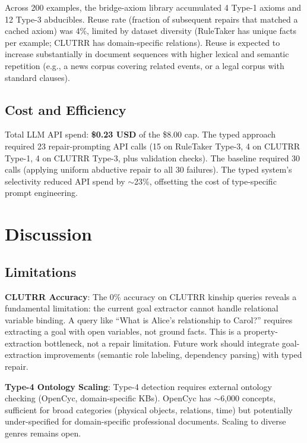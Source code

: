 \documentclass[11pt,letterpaper]{article}
\begin{document}
Across 200 examples, the bridge-axiom library accumulated 4 Type-1 axioms and 12
Type-3 abducibles. Reuse rate (fraction of subsequent repairs that matched a cached
axiom) was 4\%, limited by dataset diversity (RuleTaker has unique facts per example;
CLUTRR has domain-specific relations). Reuse is expected to increase substantially in
document sequences with higher lexical and semantic repetition (e.g., a news corpus
covering related events, or a legal corpus with standard clauses).

\subsection{Cost and Efficiency}

Total LLM API spend: \textbf{\$0.23 USD} of the \$8.00 cap. The typed approach
required 23 repair-prompting API calls (15 on RuleTaker Type-3, 4 on CLUTRR Type-1,
4 on CLUTRR Type-3, plus validation checks). The baseline required 30 calls (applying
uniform abductive repair to all 30 failures). The typed system's selectivity reduced
API spend by $\sim$23\%, offsetting the cost of type-specific prompt engineering.

\section{Discussion}
\label{sec:discussion}

\subsection{Limitations}

\textbf{CLUTRR Accuracy}: The 0\% accuracy on CLUTRR kinship queries reveals a
fundamental limitation: the current goal extractor cannot handle relational variable
binding. A query like ``What is Alice's relationship to Carol?'' requires extracting a
goal with open variables, not ground facts. This is a property-extraction bottleneck,
not a repair limitation. Future work should integrate goal-extraction improvements
(semantic role labeling, dependency parsing) with typed repair.

\textbf{Type-4 Ontology Scaling}: Type-4 detection requires external ontology checking
(OpenCyc, domain-specific KBs). OpenCyc has $\sim$6,000 concepts, sufficient for
broad categories (physical objects, relations, time) but potentially under-specified
for domain-specific professional documents. Scaling to diverse genres remains open.
\end{document}
